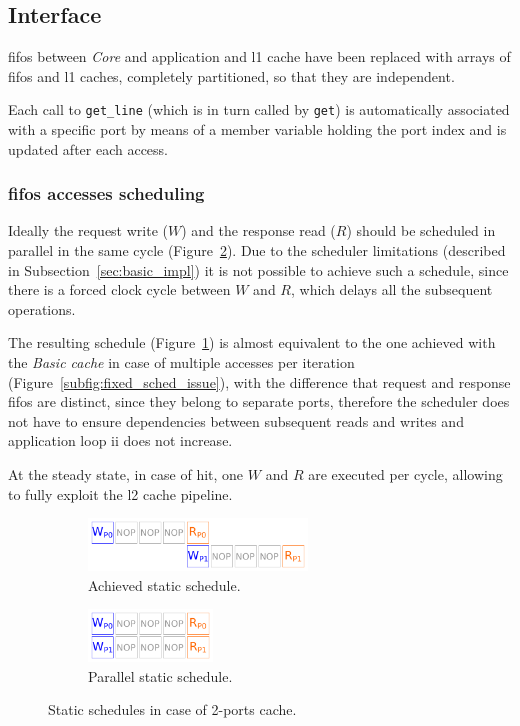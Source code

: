 \documentclass[11pt,a4paper,oneside]{memoir}
\begin{document}
\subsection{Interface}
\acp{fifo} between \emph{Core} and application and \ac{l1} cache have been
replaced with arrays of \acp{fifo} and \ac{l1} caches, completely partitioned,
so that they are independent.

Each call to \texttt{get\_line} (which is in turn called by \texttt{get}) is
automatically associated with a specific port by means of a member variable
holding the port index and is updated after each access.

\subsubsection{\acp{fifo} accesses scheduling}
Ideally the request write ($W$) and the response read ($R$) should be scheduled
in parallel in the same cycle (Figure~\ref{subfig:multiport_des_sched}).
Due to the scheduler limitations (described in
Subsection~\ref{sec:basic_impl}) it is not possible to achieve such a
schedule, since there is a forced clock cycle between $W$ and $R$, which delays
all the subsequent operations.

The resulting schedule (Figure~\ref{subfig:multiport_actual_sched}) is almost
equivalent to the one achieved with the \emph{Basic cache} in case of multiple
accesses per iteration (Figure~\ref{subfig:fixed_sched_issue}), with the
difference that request and response \acp{fifo} are distinct, since they belong
to separate ports, therefore the scheduler does not have to ensure dependencies
between subsequent reads and writes and application loop \ac{ii} does not
increase.

At the steady state, in case of hit, one $W$ and $R$ are executed per cycle,
allowing to fully exploit the \ac{l2} cache pipeline.

\begin{figure}[!htb]
	\centering
	\begin{subfigure}[b]{.4\textwidth}
		\centering
		\includegraphics[height=1.4cm]{multiport_actual_sched}
		\caption{Achieved static schedule.}
		\label{subfig:multiport_actual_sched}
	\end{subfigure}
	\hfill
	\begin{subfigure}[b]{.4\textwidth}
		\centering
		\includegraphics[height=1.4cm]{multiport_des_sched}
		\caption{Parallel static schedule.}
		\label{subfig:multiport_des_sched}
	\end{subfigure}
	\caption{Static schedules in case of 2-ports cache.}
	\label{fig:multiport_sched}
\end{figure}
\end{document}

